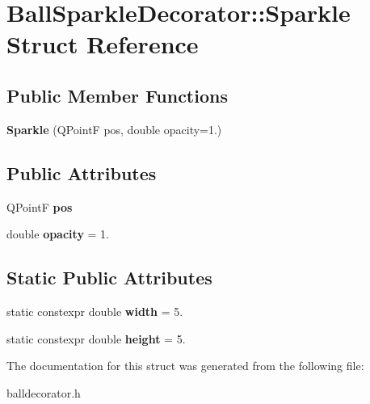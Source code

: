 \hypertarget{struct_ball_sparkle_decorator_1_1_sparkle}{}\section{Ball\+Sparkle\+Decorator\+:\+:Sparkle Struct Reference}
\label{struct_ball_sparkle_decorator_1_1_sparkle}
\subsection*{Public Member Functions}
\begin{DoxyCompactItemize}
\item 
\mbox{\label{struct_ball_sparkle_decorator_1_1_sparkle_a3c722e501faf223889464bd622375c11}} 
{\bfseries Sparkle} (Q\+PointF pos, double opacity=1.)
\end{DoxyCompactItemize}
\subsection*{Public Attributes}
\begin{DoxyCompactItemize}
\item 
\mbox{\label{struct_ball_sparkle_decorator_1_1_sparkle_aeb4b735006a31fa11fa78394a4848236}} 
Q\+PointF {\bfseries pos}
\item 
\mbox{\label{struct_ball_sparkle_decorator_1_1_sparkle_a44963032a6ce95c5b552d4c5159f88c2}} 
double {\bfseries opacity} = 1.
\end{DoxyCompactItemize}
\subsection*{Static Public Attributes}
\begin{DoxyCompactItemize}
\item 
\mbox{\label{struct_ball_sparkle_decorator_1_1_sparkle_a6602f6013f4b6d436cf07a67c9a2b98d}} 
static constexpr double {\bfseries width} = 5.
\item 
\mbox{\label{struct_ball_sparkle_decorator_1_1_sparkle_a3098571dbcb489f4821ac0446ef18d26}} 
static constexpr double {\bfseries height} = 5.
\end{DoxyCompactItemize}


The documentation for this struct was generated from the following file\+:\begin{DoxyCompactItemize}
\item 
balldecorator.\+h\end{DoxyCompactItemize}

